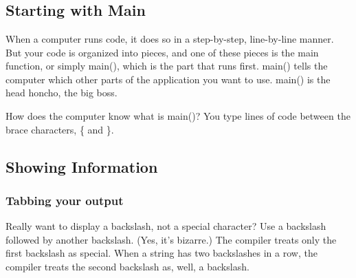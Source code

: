 \chapter{}
\section{Starting with Main}
When a computer runs code, it does so in a step-by-step, line-by-line manner. But your code is organized into pieces, and one of these pieces is the main function, or simply main(), which is the part that runs first. main() tells the computer
which other parts of the application you want to use. main() is the head honcho, the big boss.

How does the computer know what is main()? You type lines of code between the brace characters, \{ and \}.

\section{Showing Information}
\subsection{Tabbing your output}
Really want to display a backslash, not a special character? Use a backslash followed by another backslash. (Yes, it's bizarre.) The compiler treats only the first backslash as special. When a string has two backslashes in a row, the compiler treats the second backslash as, well, a backslash.
